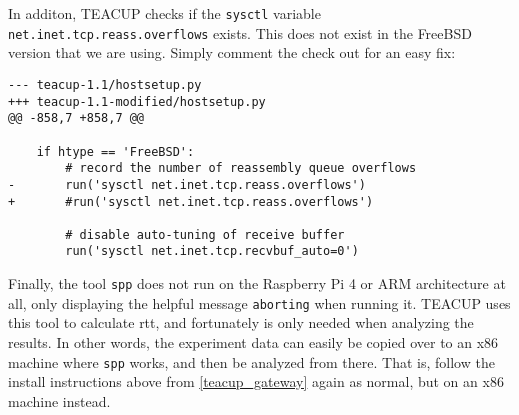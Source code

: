 In additon, TEACUP checks if the \lstinline{sysctl} variable \lstinline{net.inet.tcp.reass.overflows} exists. This does not exist in the FreeBSD version that we are using. Simply comment the check out for an easy fix:

\begin{verbatim}
--- teacup-1.1/hostsetup.py
+++ teacup-1.1-modified/hostsetup.py
@@ -858,7 +858,7 @@

    if htype == 'FreeBSD':
        # record the number of reassembly queue overflows
-       run('sysctl net.inet.tcp.reass.overflows')
+       #run('sysctl net.inet.tcp.reass.overflows')

        # disable auto-tuning of receive buffer
        run('sysctl net.inet.tcp.recvbuf_auto=0')
\end{verbatim}

Finally, the tool \lstinline{spp} does not run on the Raspberry Pi 4 or ARM architecture at all, only displaying the helpful message \lstinline{aborting} when running it. TEACUP uses this tool to calculate \gls{rtt}, and fortunately is only needed when analyzing the results. In other words, the experiment data can easily be copied over to an x86 machine where \lstinline{spp} works, and then be analyzed from there. That is, follow the install instructions above from \ref{teacup_gateway} again as normal, but on an x86 machine instead.
